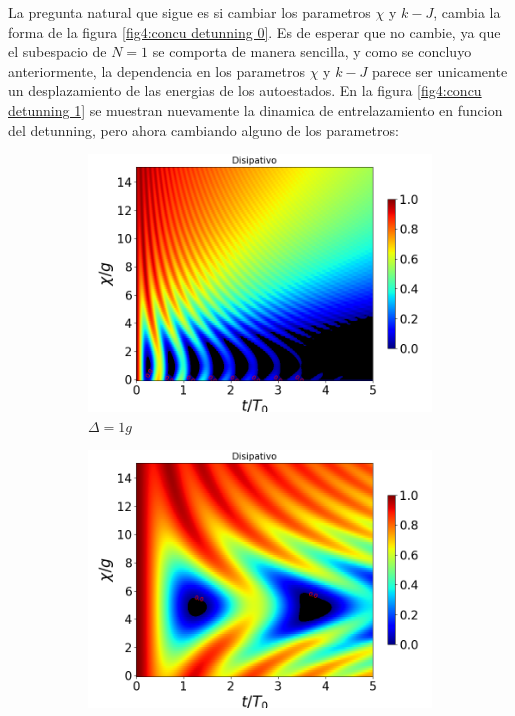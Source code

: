 La pregunta natural que sigue es si cambiar los parametros $\chi$ y $k-J$, cambia la forma de la figura \ref{fig4:concu detunning 0}. Es de esperar que no cambie, ya que el subespacio de $N=1$ se comporta de manera sencilla, y como se concluyo anteriormente, la dependencia en los parametros $\chi$ y $k-J$ parece ser unicamente un desplazamiento de las energias de los autoestados. En la figura \ref{fig4:concu detunning 1} se muestran nuevamente la dinamica de entrelazamiento en funcion del detunning, pero ahora cambiando alguno de los parametros:

\begin{figure}[h]
    \centering
    \begin{subfigure}{0.49\textwidth}
        \includegraphics[width=\textwidth]{figuras/ch4/concu/chi/eg0+ge0 d=1.0g k=0.0g J=0.0g gamma=0.25g concu chi dis.png}
        \caption{$\Delta=1g$}
        \label{fig4:concu x d1}
    \end{subfigure}
    \hfill
    \begin{subfigure}{0.49\textwidth}
        \includegraphics[width=\textwidth]{figuras/ch4/concu/chi/eg0+ge0 d=5.0g k=0.0g J=0.0g gamma=0.25g concu chi dis.png}

\end{subfigure}
\end{figure}

